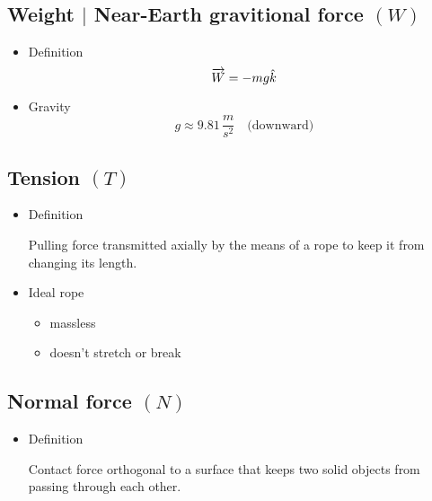     \subsection{Weight $|$ Near-Earth gravitional force $(W)$}
        \begin{itemize}
            \item Definition
                \begin{equation}
                    \overrightarrow{W}=-mg\hat{k}
                \end{equation}
            \item Gravity
                \begin{equation}
                    g\approx9.81 \, \frac{m}{s^2} \quad \textrm{(downward)}
                \end{equation}
        \end{itemize}
    \subsection{Tension $(T)$}
        \begin{itemize}
            \item Definition
                \begin{center}
                    Pulling force transmitted axially by the means of a rope to keep it from changing its length.
                \end{center}
            \item Ideal rope
                \begin{itemize}
                    \item massless
                    \item doesn't stretch or break
                \end{itemize}
        \end{itemize}
    \subsection{Normal force $(N)$}
        \begin{itemize}
            \item Definition
                \begin{center}
                    Contact force orthogonal to a surface that keeps two solid objects from passing through each other.
                \end{center}
        \end{itemize}
